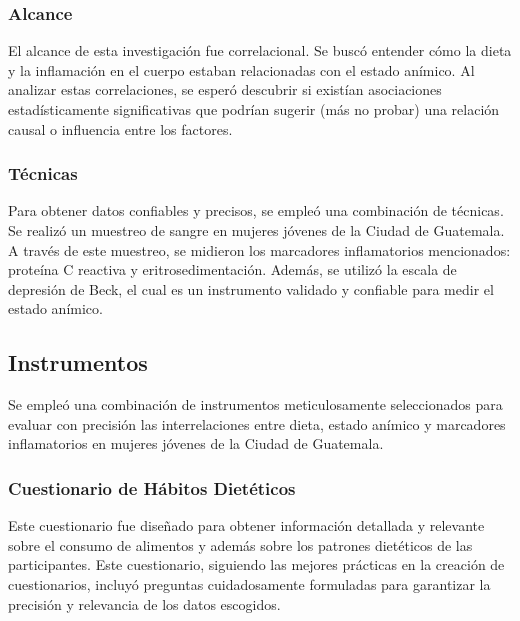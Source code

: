 \documentclass[stu, 12pt]{apa7}
\begin{document}
	\subsubsection{Alcance}
	El alcance de esta investigación fue correlacional.
	Se buscó entender cómo la dieta y la inflamación en el cuerpo estaban relacionadas
	con el estado anímico. Al analizar estas correlaciones, se
	esperó descubrir si existían asociaciones estadísticamente significativas
	que podrían sugerir (más no probar) una relación causal o influencia
	entre los factores.

	\subsubsection{Técnicas}
	Para obtener datos confiables y precisos, se empleó una combinación de técnicas. Se realizó un muestreo de sangre en mujeres jóvenes de la Ciudad de Guatemala. A través de este muestreo, se midieron los marcadores inflamatorios mencionados: proteína C reactiva y eritrosedimentación. Además, se utilizó la escala de depresión de Beck, el cual es un instrumento validado y confiable para medir el estado anímico.




	\subsection{Instrumentos}\label{subsec:instrumentos}

	Se empleó una combinación de instrumentos
	meticulosamente seleccionados para evaluar con precisión las
	interrelaciones entre dieta, estado anímico y marcadores inflamatorios
	en mujeres jóvenes de la Ciudad de Guatemala.\\

	\subsubsection{Cuestionario de Hábitos Dietéticos}
	Este cuestionario fue diseñado para obtener información detallada y relevante sobre el consumo de alimentos y además sobre los patrones dietéticos de las participantes. Este cuestionario, siguiendo las mejores prácticas en la creación de cuestionarios, incluyó preguntas cuidadosamente formuladas para garantizar la precisión y relevancia de los datos escogidos. 
\end{document}
